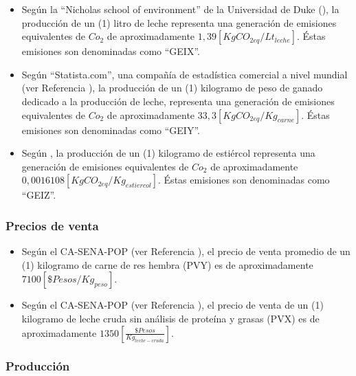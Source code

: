 \begin{itemize}
    \item Según la ``Nicholas school of environment'' de la Universidad de Duke (\cite{ecoduke}), la producción de un (1) litro de leche representa una generación de  emisiones equivalentes de $Co_{2}$ de aproximadamente $1,39[KgCO_{2eq}/Lt_{leche}]$. Éstas emisiones son denominadas como ``GEIX''.
    \item Según ``Statista.com'', una compañía de estadística comercial a nivel mundial (ver Referencia \cite{statista}), la producción de un (1) kilogramo de peso de ganado dedicado a la producción de leche, representa una generación de  emisiones equivalentes de $Co_{2}$ de aproximadamente $33,3[KgCO_{2eq}/Kg_{carne}]$. Éstas emisiones son denominadas como ``GEIY''.
    \item Según \cite{manure}, la producción de un (1) kilogramo de estiércol representa una generación de  emisiones equivalentes de $Co_{2}$ de aproximadamente $0,0016108[KgCO_{2eq}/Kg_{estiercol}]$. Éstas emisiones son denominadas como ``GEIZ''.
\end{itemize}

\subsubsection{Precios de venta}

\begin{itemize}
    \item Según el CA-SENA-POP (ver Referencia \cite{casena}), el precio  de venta promedio de un (1) kilogramo de carne de res hembra (PVY) es de aproximadamente $7100[\$Pesos/Kg_{peso}]$. 
    \item Según el CA-SENA-POP (ver Referencia \cite{casena}), el precio de venta de un (1) kilogramo de leche cruda sin análisis de proteína y grasas (PVX) es de aproximadamente $1350[\frac{\$Pesos}{Kg_{leche-cruda}}]$.
\end{itemize}

\subsubsection{Producción}

